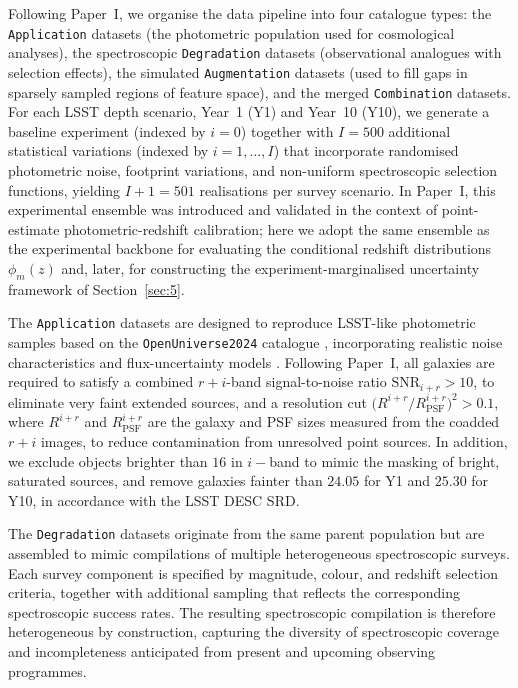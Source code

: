 Following Paper~I, we organise the data pipeline into four catalogue types: the \texttt{Application} datasets (the photometric population used for cosmological analyses), the spectroscopic \texttt{Degradation} datasets (observational analogues with selection effects), the simulated \texttt{Augmentation} datasets (used to fill gaps in sparsely sampled regions of feature space), and the merged \texttt{Combination} datasets. For each LSST depth scenario, Year~1 (Y1) and Year~10 (Y10), we generate a baseline experiment (indexed by \(i=0\)) together with \(I = 500\) additional statistical variations (indexed by \(i = 1, \ldots, I\)) that incorporate randomised photometric noise, footprint variations, and non-uniform spectroscopic selection functions, yielding \(I+1 = 501\) realisations per survey scenario. In Paper~I, this experimental ensemble was introduced and validated in the context of point-estimate photometric-redshift calibration; here we adopt the same ensemble as the experimental backbone for evaluating the conditional redshift distributions \(\phi_m(z)\) and, later, for constructing the experiment-marginalised uncertainty framework of Section~\ref{sec:5}.

The \texttt{Application} datasets are designed to reproduce LSST-like photometric samples based on the \texttt{OpenUniverse2024} catalogue \citep{2025arXiv250105632O}, incorporating realistic noise characteristics and flux-uncertainty models \citep{2024AJ....168...80C}. Following Paper~I, all galaxies are required to satisfy a combined \(r{+}i\)-band signal-to-noise ratio \(\mathrm{SNR}_{i+r} > 10\), to eliminate very faint extended sources, and a resolution cut \(\bigl(R^{i+r}/R_\mathrm{PSF}^{i+r}\bigr)^{2} > 0.1\), where \(R^{i+r}\) and \(R_\mathrm{PSF}^{i+r}\) are the galaxy and PSF sizes measured from the coadded \(r{+}i\) images, to reduce contamination from unresolved point sources. In addition, we exclude objects brighter than \(16 \) in \(i-\)band to mimic the masking of bright, saturated sources, and remove galaxies fainter than \(24.05\) for Y1 and \(25.30\) for Y10, in accordance with the LSST DESC SRD. 

The \texttt{Degradation} datasets originate from the same parent population but are assembled to mimic compilations of multiple heterogeneous spectroscopic surveys. Each survey component is specified by magnitude, colour, and redshift selection criteria, together with additional sampling that reflects the corresponding spectroscopic success rates. The resulting spectroscopic compilation is therefore heterogeneous by construction, capturing the diversity of spectroscopic coverage and incompleteness anticipated from present and upcoming observing programmes.

